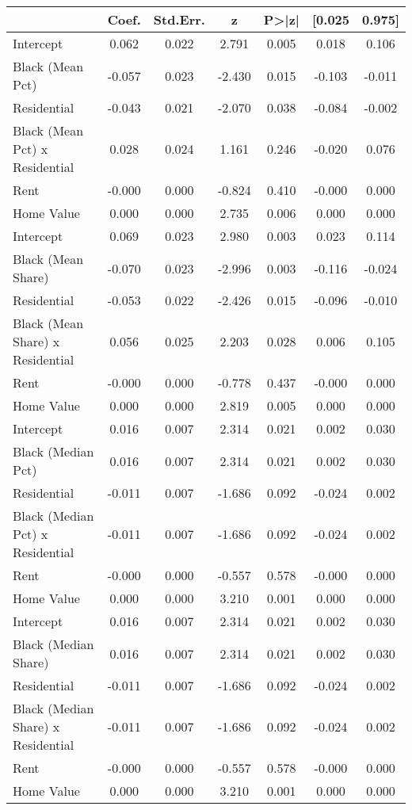 \begin{tabular}{lcccccc}
\toprule
 & Coef. & Std.Err. & z & P>|z| & [0.025 & 0.975] \\
\midrule
Intercept & 0.062 & 0.022 & 2.791 & 0.005 & 0.018 & 0.106 \\
Black (Mean Pct) & -0.057 & 0.023 & -2.430 & 0.015 & -0.103 & -0.011 \\
Residential & -0.043 & 0.021 & -2.070 & 0.038 & -0.084 & -0.002 \\
Black (Mean Pct) x Residential & 0.028 & 0.024 & 1.161 & 0.246 & -0.020 & 0.076 \\
Rent & -0.000 & 0.000 & -0.824 & 0.410 & -0.000 & 0.000 \\
Home Value & 0.000 & 0.000 & 2.735 & 0.006 & 0.000 & 0.000 \\
Intercept & 0.069 & 0.023 & 2.980 & 0.003 & 0.023 & 0.114 \\
Black (Mean Share) & -0.070 & 0.023 & -2.996 & 0.003 & -0.116 & -0.024 \\
Residential & -0.053 & 0.022 & -2.426 & 0.015 & -0.096 & -0.010 \\
Black (Mean Share) x Residential & 0.056 & 0.025 & 2.203 & 0.028 & 0.006 & 0.105 \\
Rent & -0.000 & 0.000 & -0.778 & 0.437 & -0.000 & 0.000 \\
Home Value & 0.000 & 0.000 & 2.819 & 0.005 & 0.000 & 0.000 \\
Intercept & 0.016 & 0.007 & 2.314 & 0.021 & 0.002 & 0.030 \\
Black (Median Pct) & 0.016 & 0.007 & 2.314 & 0.021 & 0.002 & 0.030 \\
Residential & -0.011 & 0.007 & -1.686 & 0.092 & -0.024 & 0.002 \\
Black (Median Pct) x Residential & -0.011 & 0.007 & -1.686 & 0.092 & -0.024 & 0.002 \\
Rent & -0.000 & 0.000 & -0.557 & 0.578 & -0.000 & 0.000 \\
Home Value & 0.000 & 0.000 & 3.210 & 0.001 & 0.000 & 0.000 \\
Intercept & 0.016 & 0.007 & 2.314 & 0.021 & 0.002 & 0.030 \\
Black (Median Share) & 0.016 & 0.007 & 2.314 & 0.021 & 0.002 & 0.030 \\
Residential & -0.011 & 0.007 & -1.686 & 0.092 & -0.024 & 0.002 \\
Black (Median Share) x Residential & -0.011 & 0.007 & -1.686 & 0.092 & -0.024 & 0.002 \\
Rent & -0.000 & 0.000 & -0.557 & 0.578 & -0.000 & 0.000 \\
Home Value & 0.000 & 0.000 & 3.210 & 0.001 & 0.000 & 0.000 \\
\bottomrule
\end{tabular}
